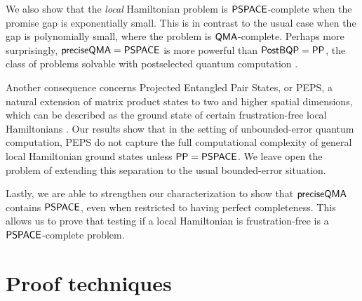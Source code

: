 \documentclass[11pt]{article}
\newcommand{\classfont}{\sf}
\newtheorem{theorem}[lemma]{Theorem}
\newtheorem{definition}[lemma]{Definition}
\numberwithin{lemma}{section}
\theoremstyle{definition}
\newcommand\PostBQP{{\sf{PostBQP}}}
\newcommand\PP{\sf{PP}}
\newcommand\PSPACE{\sf{PSPACE}}
\newcommand\preciseQMA{{\sf{preciseQMA}}}
\newcommand\QMA{{\sf{QMA}}}
\newcommand{\Unitary}{\mathbf{U}}
\newcommand{\unitaryBQSPACE}[1]{{\classfont{BQ}_\Unitary\classfont{SPACE}}[#1]}
\newcommand{\poly}{\mathrm{poly}}
\renewcommand{\le}{\leqslant}
\renewcommand{\ge}{\geqslant}
\newcommand\psham[1]{#1\textit{\sf{-Precise Succinct Hamiltonian}}}
\begin{document}
We also show that the \emph{local} Hamiltonian problem is $\PSPACE$-complete when the promise gap is exponentially small. This is in contrast to the usual case when the gap is polynomially small, where the problem is $\QMA$-complete. Perhaps more surprisingly, $\preciseQMA = \PSPACE$ is more powerful than $\PostBQP=\PP$, the class of problems solvable with postselected quantum computation \cite{aaronson05}.

Another consequence concerns Projected Entangled Pair States, or PEPS, a natural extension of matrix product states to two and higher spatial dimensions, which can be described as the ground state of certain frustration-free local Hamiltonians \cite{vc04}. Our results show that in the setting of unbounded-error quantum computation, PEPS do not capture the full computational complexity of general local Hamiltonian ground states unless $\PP=\PSPACE$. We leave open the problem of extending this separation to the usual bounded-error situation.

Lastly, we are able to strengthen our characterization to show that $\preciseQMA$ contains $\PSPACE$, even when restricted to having perfect completeness.  This allows us to prove that testing if a local Hamiltonian is frustration-free is a $\PSPACE$-complete problem.
\section{Proof techniques}
\end{document}
